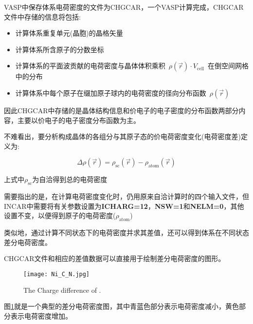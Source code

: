 \textrm{VASP}中保存体系电荷密度的文件为\textrm{CHGCAR}，一个\textrm{VASP}计算完成，\textrm{CHGCAR}文件中存储的信息将包括:
\begin{itemize}
	\item 计算体系重复单元(晶胞)的晶格矢量
	\item 计算体系所含原子的分数坐标
	\item 计算体系的平面波贡献的电荷密度与晶体体积乘积~$\rho(\vec r)\cdot V_{\mathrm{cell}}$~在倒空间网格中的分布
	\item 计算体系中每个原子在缀加原子球内的电荷密度的径向分布函数~$\rho(\vec r)$
\end{itemize}
因此\textrm{CHGCAR}中存储的是晶体结构信息和价电子的电子密度的分布函数两部分内容，主要以价电子的电子密度分布函数为主。

不难看出，要分析构成晶体的各组分与其原子态的价电荷密度变化(电荷密度差)定义为:

\begin{displaymath}
	\Delta\rho(\vec r) = \rho_{\mathrm{sc}}(\vec r) - \rho_{\mathrm{atom}}(\vec r)
\end{displaymath}

上式中$\rho_{\mathrm{sc}}$为自洽得到总的电荷密度

需要指出的是，在计算电荷密度变化时，仍用原来自洽计算时的四个输入文件，但\textrm{INCAR}中需要将有关参数设置为{\textbf{ICHARG=12}}，{\textbf{NSW=1}}和{\textbf{NELM=0}}，其他设置不变，以便得到原子的电荷密度($\rho_{\mathrm{atom}}$)

类似地，通过计算不同状态下的电荷密度并求其差值，还可以得到体系在不同状态差分电荷密度。

\textrm{CHGCAR}文件和相应的差值数据可以直接用于绘制差分电荷密度的图形。

\begin{figure}[h!]
\centering
\texttt{[image: Ni\_C\_N.jpg]}
\caption{\small The Charge difference of .}%
\label{Charge_Diffence}
\end{figure}

图\ref{Charge_Diffence}就是一个典型的差分电荷密度图，其中青蓝色部分表示电荷密度减小，黄色部分表示电荷密度增加。
